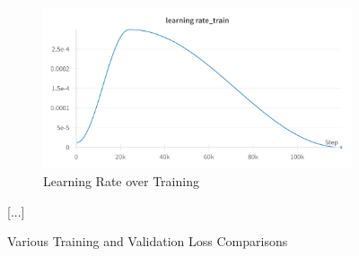 \documentclass[a4paper]{article}
\begin{document}
\begin{figure}[H]
  \centering
  \begin{subfigure}{\textwidth}
    \centering
    \includegraphics[width=\linewidth]{learning-rate-train.png}
    \caption{Learning Rate over Training}
    \label{fig:learning-rate-train}
  \end{subfigure}%
  \hfill
  [...] %
  \caption{Various Training and Validation Loss Comparisons}
\end{figure}
\end{document}
